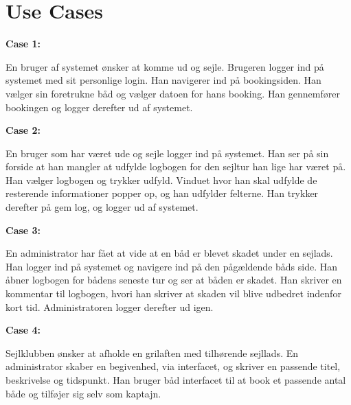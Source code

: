 \chapter{Use Cases}\label{Use_cases}
\cbstart
\textbf{Case 1:}

En bruger af systemet ønsker at komme ud og sejle. Brugeren logger ind på systemet med sit personlige login. Han navigerer ind på bookingsiden. Han vælger sin foretrukne båd og vælger datoen for hans booking. Han gennemfører bookingen og logger derefter ud af systemet.

\textbf{Case 2:}

En bruger som har været ude og sejle logger ind på systemet. Han ser på sin forside at han mangler at udfylde logbogen for den sejltur han lige har været på. Han vælger logbogen og trykker udfyld. Vinduet hvor han skal udfylde de resterende informationer popper op, og han udfylder felterne. Han trykker derefter på gem log, og logger ud af systemet.

\textbf{Case 3:}

En administrator har fået at vide at en båd er blevet skadet under en sejlads. Han logger ind på systemet og navigere ind på den pågældende båds side. Han åbner logbogen for bådens seneste tur og ser at båden er skadet. Han skriver en kommentar til logbogen, hvori han skriver at skaden vil blive udbedret indenfor kort tid. Administratoren logger derefter ud igen.

\textbf{Case 4:}

Sejlklubben ønsker at afholde en grilaften med tilhørende sejllads. 
En administrator skaber en begivenhed, via interfacet, og skriver en passende titel, beskrivelse og tidspunkt. 
Han bruger båd interfacet til at book et passende antal både og tilføjer sig selv som kaptajn.

\cbend